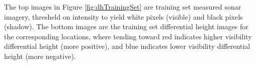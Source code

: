 The top images in Figure \ref{fig:dhTrainingSet} are training set measured sonar imagery, thresheld on intensity to yield white pixels (visible) and black pixels (shadow).  
The bottom images are the training set differential height images for the corresponding locations, where tending toward red indicates higher visibility differential height (more positive), and blue indicates lower visibility differential height (more negative).  


